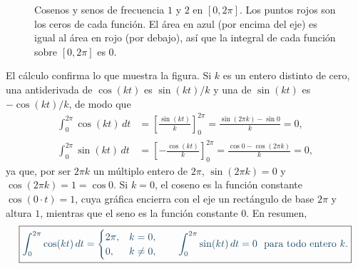 \begin{figure}[H]
\centering
{}
\hfill
{}

\vspace{2mm}
\hfill
{}
\caption{Cosenos y senos de frecuencia $1$ y $2$ en $[0,2\pi]$. Los puntos rojos son los ceros
de cada función. El área en azul (por encima del eje) es igual al área en rojo (por debajo),
así que la integral de cada función sobre $[0,2\pi]$ es $0$.}
\label{fig:integrales}
\end{figure}

El cálculo confirma lo que muestra la figura. Si $k$ es un entero distinto de cero, una
antiderivada de $\cos(kt)$ es $\sin(kt)/k$ y una de $\sin(kt)$ es $-\cos(kt)/k$, de modo que
\begin{align*}
  \int_0^{2\pi}\cos(kt)\,dt&=\left[\frac{\sin(kt)}{k}\right]_0^{2\pi}
  =\frac{\sin(2\pi k)-\sin 0}{k}=0,\\[1mm]
  \int_0^{2\pi}\sin(kt)\,dt&=\left[-\frac{\cos(kt)}{k}\right]_0^{2\pi}
  =\frac{\cos 0-\cos(2\pi k)}{k}=0,
\end{align*}
ya que, por ser $2\pi k$ un múltiplo entero de $2\pi$, $\sin(2\pi k)=0$ y
$\cos(2\pi k)=1=\cos 0$. Si $k=0$, el coseno es la función constante $\cos(0\cdot t)=1$, cuya
gráfica encierra con el eje un rectángulo de base $2\pi$ y altura $1$, mientras que el seno es
la función constante $0$. En resumen,
\begin{equation}\label{eq:integrales}
  \destacado{\int_0^{2\pi}\cos(kt)\,dt=
  \begin{cases} 2\pi, & k=0,\\ 0, & k\ne 0,\end{cases}
  \qquad
  \int_0^{2\pi}\sin(kt)\,dt=0\ \text{ para todo entero } k.}
\end{equation}

